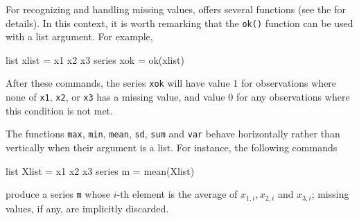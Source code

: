 For recognizing and handling missing values,  offers
several functions (see the \GCR{} for details). In this context, it is
worth remarking that the \texttt{ok()} function can be used with a
list argument.  For example,
%
\begin{code}
list xlist = x1 x2 x3
series xok = ok(xlist)
\end{code}
%
After these commands, the series \texttt{xok} will have value 1 for
observations where none of \texttt{x1}, \texttt{x2}, or
\texttt{x3} has a missing value, and value 0 for any observations
where this condition is not met.

The functions \texttt{max}, \texttt{min}, \texttt{mean}, \texttt{sd},
\texttt{sum} and \texttt{var} behave horizontally rather than
vertically when their argument is a list. For instance, the following
commands
\begin{code}
  list Xlist = x1 x2 x3
  series m = mean(Xlist)
\end{code}
produce a series \texttt{m} whose $i$-th element is the average of
$x_{1,i}, x_{2,i}$ and $x_{3,i}$; missing values, if any, are implicitly discarded.


